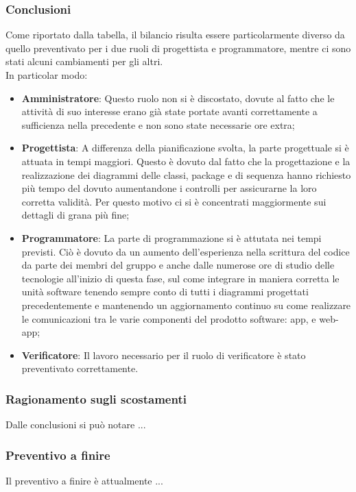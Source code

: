 \subsubsection{Conclusioni}
Come riportato dalla tabella, il bilancio risulta essere particolarmente diverso da quello preventivato per i due ruoli di progettista e programmatore, mentre ci sono stati alcuni cambiamenti per gli altri.\\
In particolar modo:
\begin{itemize}
	\item \textbf{Amministratore}: Questo ruolo non si è discostato, dovute al fatto che le attività di suo interesse erano già state portate avanti correttamente a sufficienza nella precedente  e non sono state necessarie ore extra;
    \item \textbf{Progettista}: A differenza della pianificazione svolta, la parte progettuale si è attuata in tempi maggiori. Questo è dovuto dal fatto che la progettazione e la 
    realizzazione dei diagrammi delle classi, package e di sequenza hanno richiesto più tempo del dovuto aumentandone i controlli per assicurarne la loro corretta validità.
	Per questo motivo ci si è concentrati maggiormente sui dettagli di grana più fine;
    \item \textbf{Programmatore}: La parte di programmazione si è attutata nei tempi previsti. Ciò è dovuto da un aumento dell'esperienza nella scrittura del codice da parte dei 
    membri del gruppo \Gruppo{} e anche dalle numerose ore di studio delle tecnologie all'inizio di questa fase, sul come integrare in maniera corretta le unità software tenendo sempre conto di tutti i diagrammi progettati precedentemente e mantenendo
    un aggiornamento continuo su come realizzare le comunicazioni tra le varie componenti del prodotto software: app,  e web-app;
	\item \textbf{Verificatore}: Il lavoro necessario per il ruolo di verificatore è stato preventivato correttamente. 
\end{itemize}
\subsubsection{Ragionamento sugli scostamenti}
Dalle conclusioni si può notare ...


\subsubsection{Preventivo a finire}
Il preventivo a finire è attualmente ...